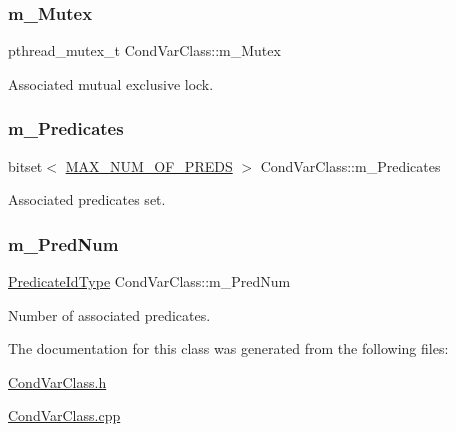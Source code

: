\mbox{\label{classCondVarClass_a175e2f43db6ca2fe35d4d1a35b8b2453}} 
\subsubsection{\texorpdfstring{m\+\_\+\+Mutex}{m\_Mutex}}
{\footnotesize\ttfamily pthread\+\_\+mutex\+\_\+t Cond\+Var\+Class\+::m\+\_\+\+Mutex\hspace{0.3cm}{\ttfamily [protected]}}



Associated mutual exclusive lock. 

\mbox{\label{classCondVarClass_aaf966656af82194b11b9277dfd331d7f}} 
\subsubsection{\texorpdfstring{m\+\_\+\+Predicates}{m\_Predicates}}
{\footnotesize\ttfamily bitset$<$ \hyperlink{CondVarClass_8h_a6e8562f77c7eeea17bbd7dad99cc5a5d}{M\+A\+X\+\_\+\+N\+U\+M\+\_\+\+O\+F\+\_\+\+P\+R\+E\+DS} $>$ Cond\+Var\+Class\+::m\+\_\+\+Predicates\hspace{0.3cm}{\ttfamily [protected]}}



Associated predicates set. 

\mbox{\label{classCondVarClass_a3e3eff2444917f162ede65d687ebeb06}} 
\subsubsection{\texorpdfstring{m\+\_\+\+Pred\+Num}{m\_PredNum}}
{\footnotesize\ttfamily \hyperlink{classCondVarClass_a8e27f99972b8b95f064d6657a4583a5b}{Predicate\+Id\+Type} Cond\+Var\+Class\+::m\+\_\+\+Pred\+Num\hspace{0.3cm}{\ttfamily [protected]}}



Number of associated predicates. 



The documentation for this class was generated from the following files\+:\begin{DoxyCompactItemize}
\item 
\hyperlink{CondVarClass_8h}{Cond\+Var\+Class.\+h}\item 
\hyperlink{CondVarClass_8cpp}{Cond\+Var\+Class.\+cpp}\end{DoxyCompactItemize}
